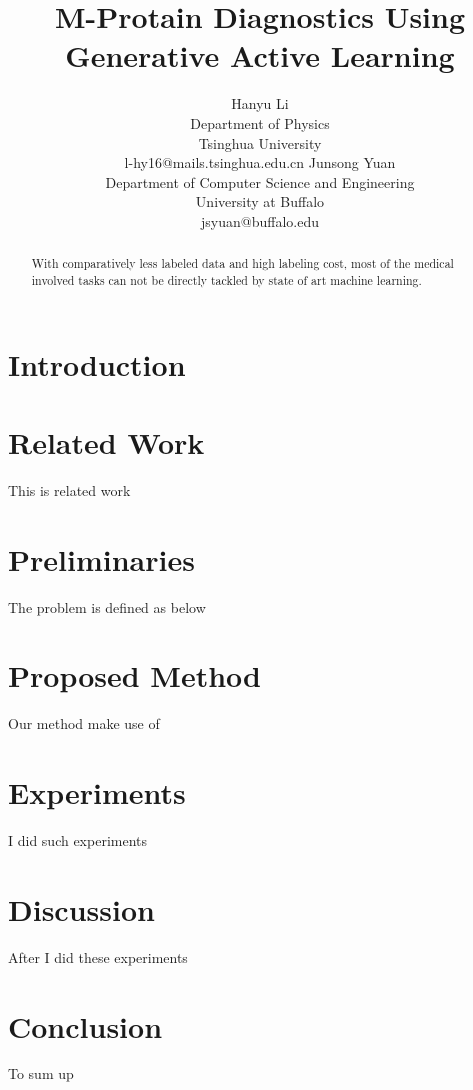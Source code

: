 \documentclass[letterpaper]{article}
\title{M-Protain Diagnostics Using Generative Active Learning}
\author{Hanyu Li\\
Department of Physics\\
Tsinghua University\\
l-hy16@mails.tsinghua.edu.cn
\And
Junsong Yuan\\
Department of Computer Science and Engineering\\
University at Buffalo\\
jsyuan@buffalo.edu}
\begin{document}
\maketitle


\begin{abstract}
    With comparatively less labeled data and high labeling cost, most of the medical involved tasks can not be directly tackled by state of art machine learning.
\end{abstract}


\section{Introduction}
\cite{Zhu2017GenerativeAA}


\section{Related Work}
This is related work

\section{Preliminaries}
The problem is defined as below

\section{Proposed Method}
Our method make use of

\section{Experiments}
I did such experiments

\section{Discussion}
After I did these experiments

\section{Conclusion}
To sum up



\end{document}
